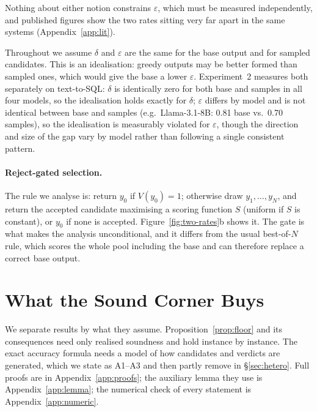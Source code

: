 \documentclass[11pt]{article}
\begin{document}
Nothing about either notion constrains $\varepsilon$, which must be measured independently, and published figures show the two rates sitting very far apart in the same systems (Appendix~\ref{app:lit}).



Throughout we assume $\delta$ and $\varepsilon$ are the same for the base output and for sampled candidates. This is an idealisation: greedy outputs may be better formed than sampled ones, which would give the base a lower $\varepsilon$. Experiment~2 measures both separately on text-to-SQL: $\delta$ is identically zero for both base and samples in all four models, so the idealisation holds exactly for $\delta$; $\varepsilon$ differs by model and is not identical between base and samples (e.g.\ Llama-3.1-8B: 0.81 base vs.\ 0.70 samples), so the idealisation is measurably violated for $\varepsilon$, though the direction and size of the gap vary by model rather than following a single consistent pattern.



\paragraph{Reject-gated selection.} The rule we analyse is: return $y_0$ if $V(y_0)=1$; otherwise draw $y_1,\dots,y_N$, and return the accepted candidate maximising a scoring function $S$ (uniform if $S$ is constant), or $y_0$ if none is accepted. Figure~\ref{fig:two-rates}b shows it. The gate is what makes the analysis unconditional, and it differs from the usual best-of-$N$ rule, which scores the whole pool including the base and can therefore replace a correct base output.

\section{What the Sound Corner Buys}\label{sec:theory}
We separate results by what they assume. Proposition~\ref{prop:floor} and its consequences need only realised soundness and hold instance by instance. The exact accuracy formula needs a model of how candidates and verdicts are generated, which we state as A1--A3 and then partly remove in \S\ref{sec:hetero}. Full proofs are in Appendix~\ref{app:proofs}; the auxiliary lemma they use is Appendix~\ref{app:lemma}; the numerical check of every statement is Appendix~\ref{app:numeric}.
\end{document}
